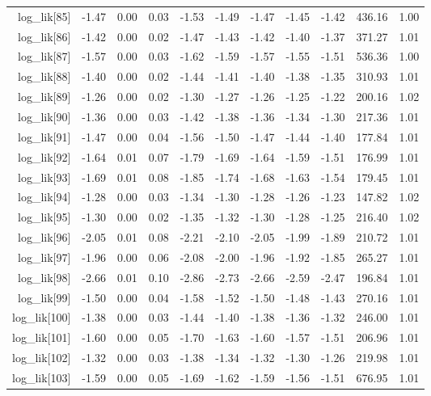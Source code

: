 \begin{table}[ht]
\begin{tabular}{rrrrrrrrrrr}
  log\_lik[85] & -1.47 & 0.00 & 0.03 & -1.53 & -1.49 & -1.47 & -1.45 & -1.42 & 436.16 & 1.00 \\ 
  log\_lik[86] & -1.42 & 0.00 & 0.02 & -1.47 & -1.43 & -1.42 & -1.40 & -1.37 & 371.27 & 1.01 \\ 
  log\_lik[87] & -1.57 & 0.00 & 0.03 & -1.62 & -1.59 & -1.57 & -1.55 & -1.51 & 536.36 & 1.00 \\ 
  log\_lik[88] & -1.40 & 0.00 & 0.02 & -1.44 & -1.41 & -1.40 & -1.38 & -1.35 & 310.93 & 1.01 \\ 
  log\_lik[89] & -1.26 & 0.00 & 0.02 & -1.30 & -1.27 & -1.26 & -1.25 & -1.22 & 200.16 & 1.02 \\ 
  log\_lik[90] & -1.36 & 0.00 & 0.03 & -1.42 & -1.38 & -1.36 & -1.34 & -1.30 & 217.36 & 1.01 \\ 
  log\_lik[91] & -1.47 & 0.00 & 0.04 & -1.56 & -1.50 & -1.47 & -1.44 & -1.40 & 177.84 & 1.01 \\ 
  log\_lik[92] & -1.64 & 0.01 & 0.07 & -1.79 & -1.69 & -1.64 & -1.59 & -1.51 & 176.99 & 1.01 \\ 
  log\_lik[93] & -1.69 & 0.01 & 0.08 & -1.85 & -1.74 & -1.68 & -1.63 & -1.54 & 179.45 & 1.01 \\ 
  log\_lik[94] & -1.28 & 0.00 & 0.03 & -1.34 & -1.30 & -1.28 & -1.26 & -1.23 & 147.82 & 1.02 \\ 
  log\_lik[95] & -1.30 & 0.00 & 0.02 & -1.35 & -1.32 & -1.30 & -1.28 & -1.25 & 216.40 & 1.02 \\ 
  log\_lik[96] & -2.05 & 0.01 & 0.08 & -2.21 & -2.10 & -2.05 & -1.99 & -1.89 & 210.72 & 1.01 \\ 
  log\_lik[97] & -1.96 & 0.00 & 0.06 & -2.08 & -2.00 & -1.96 & -1.92 & -1.85 & 265.27 & 1.01 \\ 
  log\_lik[98] & -2.66 & 0.01 & 0.10 & -2.86 & -2.73 & -2.66 & -2.59 & -2.47 & 196.84 & 1.01 \\ 
  log\_lik[99] & -1.50 & 0.00 & 0.04 & -1.58 & -1.52 & -1.50 & -1.48 & -1.43 & 270.16 & 1.01 \\ 
  log\_lik[100] & -1.38 & 0.00 & 0.03 & -1.44 & -1.40 & -1.38 & -1.36 & -1.32 & 246.00 & 1.01 \\ 
  log\_lik[101] & -1.60 & 0.00 & 0.05 & -1.70 & -1.63 & -1.60 & -1.57 & -1.51 & 206.96 & 1.01 \\ 
  log\_lik[102] & -1.32 & 0.00 & 0.03 & -1.38 & -1.34 & -1.32 & -1.30 & -1.26 & 219.98 & 1.01 \\ 
  log\_lik[103] & -1.59 & 0.00 & 0.05 & -1.69 & -1.62 & -1.59 & -1.56 & -1.51 & 676.95 & 1.01 \\ 

\end{tabular}
\end{table}
